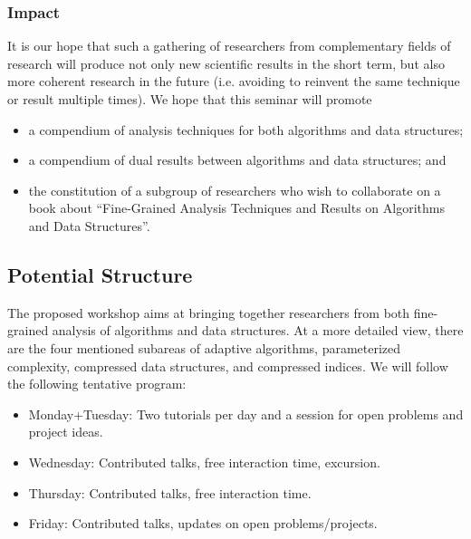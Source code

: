 \documentclass[a4paper,10pt]{article}
\begin{document}



\subsubsection{Impact}
\label{sec:impact}

It is our hope that such a gathering of researchers from complementary fields of research will produce not only new scientific results in the short term, but also more coherent research in the future (i.e. avoiding to reinvent the same technique or result multiple times). We hope that this seminar will promote
\begin{itemize}
\item a compendium of analysis techniques for both algorithms and data structures; 
\item a compendium of dual results between algorithms and data structures; and
\item the constitution of a subgroup of researchers who wish to collaborate on a book about ``Fine-Grained Analysis Techniques and Results on Algorithms and Data Structures''.
\end{itemize}


\subsection{Potential Structure}

The proposed workshop aims at bringing together researchers from both fine-grained analysis of algorithms and data structures. At a more detailed view, there are the four mentioned subareas of adaptive algorithms, parameterized complexity, compressed data structures, and compressed indices. We will follow the following tentative program:
\begin{itemize}
 \item Monday+Tuesday: Two tutorials per day and a session for open problems and project ideas.
 \item Wednesday: Contributed talks, free interaction time, excursion.
 \item Thursday: Contributed talks, free interaction time.
 \item Friday: Contributed talks, updates on open problems/projects.
\end{itemize}
\end{document}
